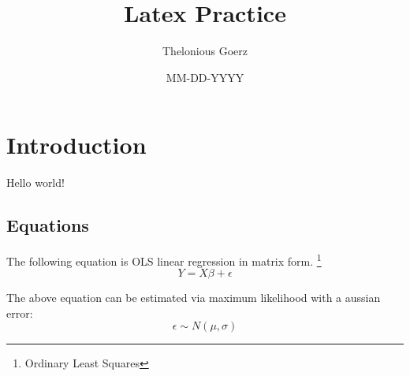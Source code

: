 \documentclass[12pt]{article}
\title{Latex Practice}
\author{Thelonious Goerz}
\date{MM-DD-YYYY}
\begin{document}
\maketitle

\section{Introduction}

Hello world! 

\subsection{Equations}

The following equation is OLS linear regression in matrix form. \footnote{Ordinary Least Squares}
\begin{equation}
Y = X\beta + \epsilon
\end{equation}

The above equation can be estimated via maximum likelihood with a aussian error: 
\begin{equation}
\epsilon \sim N(\mu,\sigma)
\end{equation}
\end{document}
